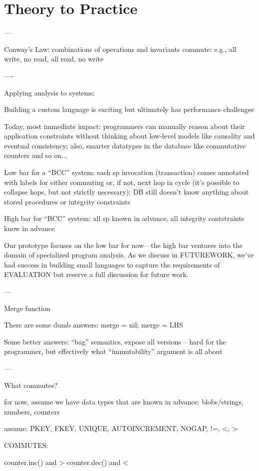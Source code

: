 
\section{Theory to Practice}
\label{sec:bcc-practice}

---

Conway's Law: combinations of operations and invariants commute: e.g., all write, no read, all read, no write

----

Applying analysis to systems:

Building a custom language is exciting but ultimately has performance challenges

Today, most immediate impact: programmers can manually reason about their application constraints without thinking about low-level models like causality and eventual consistency; also, smarter datatypes in the database like commutative counters and so on...

Low bar for a ``BCC'' system: each sp invocation (transaction) comes annotated with labels for either commuting or, if not, next hop in cycle (it's possible to collapse hops, but not strictly necessary); DB still doesn't know anything about stored procedures or integrity constraints

High bar for ``BCC'' system: all sp known in advance, all integrity contstraints know in advance

Our prototype focuses on the low bar for now---the high bar ventures into the domain of specialized program analysis. As we discuss in FUTUREWORK, we've had success in building small languages to capture the requirements of EVALUATION but reserve a full discussion for future work.

---

Merge function

There are some dumb answers: merge = nil; merge = LHS

Some better answers:
``bag'' semantics, expose all versions -- hard for the programmer, but effectively what ``immutability'' argument is all about

---

What commutes?

for now, assume we have data types that are known in advance: blobs/strings, numbers, counters

assume: PKEY, FKEY, UNIQUE, AUTOINCREMENT, NOGAP, !=, <, >

COMMUTES: 

counter.inc() and >
counter.dec() and <

